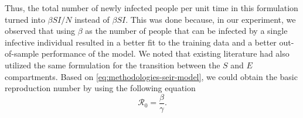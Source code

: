 Thus, the total number of newly infected people per unit time in this formulation turned into $\beta SI / N$ instead of $\beta SI$.
This was done because, in our experiment, we observed that using $\beta$ as the number of people that can be infected by a single infective individual resulted in a better fit to the training data and a better out-of-sample performance of the model.
We noted that existing literature \cite{arikInterpretableSequenceLearning, bastosModelingForecastingEarly2020,dengDynamicsDevelopmentCOVID192020, heSEIRModelingCOVID192020,ihmecovid-19forecastingteamModelingCOVID19Scenarios2021, ndairouMathematicalModelingCOVID192020,sarkarModelingForecastingCOVID192020, zhaoModelingEpidemicDynamics2020} had also utilized the same formulation for the transition between the $S$ and $E$ compartments.
Based on \autoref{eq:methodologies-seir-model}, we could obtain the basic reproduction number by using the following equation
\begin{equation*}
    \mathcal{R}_0 = \frac{\beta}{\gamma}.
    \label{eq:methodologies-seir-reproduction-number}
\end{equation*}

